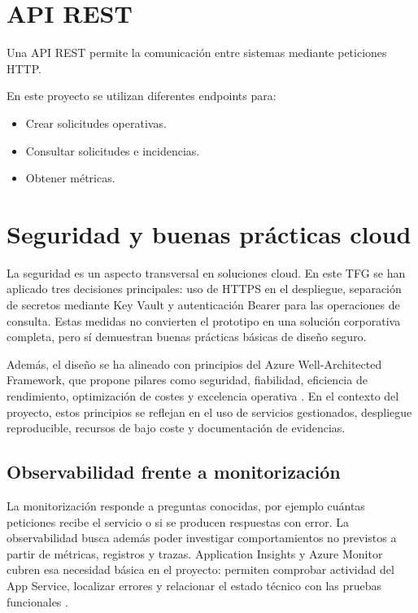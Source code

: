\section{API REST}

Una API REST permite la comunicación entre sistemas mediante peticiones HTTP.

En este proyecto se utilizan diferentes endpoints para:

\begin{itemize}
    \item Crear solicitudes operativas.
    \item Consultar solicitudes e incidencias.
    \item Obtener métricas.
\end{itemize}

\section{Seguridad y buenas prácticas cloud}

La seguridad es un aspecto transversal en soluciones cloud. En este TFG se han aplicado tres decisiones principales: uso de HTTPS en el despliegue, separación de secretos mediante Key Vault y autenticación Bearer para las operaciones de consulta. Estas medidas no convierten el prototipo en una solución corporativa completa, pero sí demuestran buenas prácticas básicas de diseño seguro.

\begin{sloppypar}
Además, el diseño se ha alineado con principios del Azure Well-Architected Framework, que propone pilares como seguridad, fiabilidad, eficiencia de rendimiento, optimización de costes y excelencia operativa \cite{azure_well_architected_framework}. En el contexto del proyecto, estos principios se reflejan en el uso de servicios gestionados, despliegue reproducible, recursos de bajo coste y documentación de evidencias.
\end{sloppypar}

\subsection{Observabilidad frente a monitorización}

La monitorización responde a preguntas conocidas, por ejemplo cuántas peticiones recibe el servicio o si se producen respuestas con error. La observabilidad busca además poder investigar comportamientos no previstos a partir de métricas, registros y trazas. Application Insights y Azure Monitor cubren esa necesidad básica en el proyecto: permiten comprobar actividad del App Service, localizar errores y relacionar el estado técnico con las pruebas funcionales \cite{azure_monitor}.

